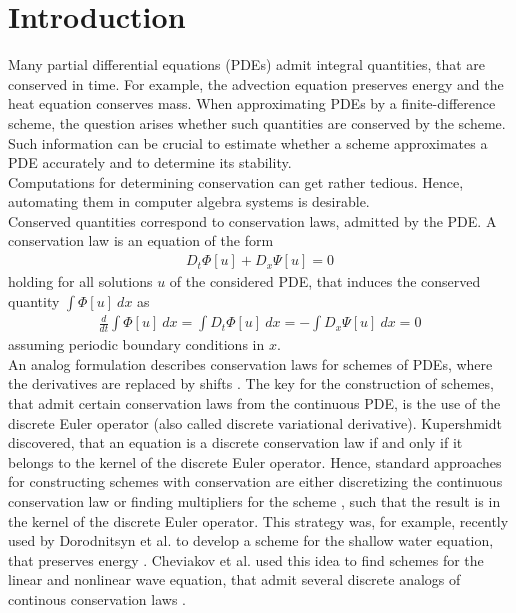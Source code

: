 \documentclass[manuscript]{acmart}
\newcommand{\1}{{\chi}}
\numberwithin{equation}{section}
\theoremstyle{thmlemcorr}
\numberwithin{theorem}{section}
\theoremstyle{thmlemcorr*}
\theoremstyle{defi}
\theoremstyle{remexample}
\theoremstyle{ass}
\begin{document}
\section{Introduction}
Many partial differential equations (PDEs) admit integral quantities, that are conserved in time. 
For example, the advection equation preserves energy and the heat equation conserves mass. 
When approximating PDEs by a finite-difference scheme, the question arises whether such quantities are conserved by the scheme. 
Such information can be crucial to estimate whether a scheme approximates a PDE accurately and to determine its stability.\\
Computations for determining conservation can get rather tedious.
Hence, automating them in computer algebra systems is desirable.\\
Conserved quantities correspond to conservation laws, admitted by the PDE. A conservation law \cite{cheviakov20} is an equation of the form
\begin{gather*}
	D_t\Phi[u]+D_x\Psi[u]=0
\end{gather*}
holding for all solutions $u$ of the considered PDE,
that induces the conserved quantity $\int \Phi[u]\ dx$ as
\begin{gather*}
	\frac{d}{dt}\int \Phi[u]\ dx=\int D_t\Phi[u]\ dx=-\int D_x\Psi[u]\ dx=0
\end{gather*}
assuming periodic boundary conditions in $x$.\\
An analog formulation describes conservation laws for schemes of PDEs, where the derivatives are replaced by shifts \cite{hydon01}.  The key for the construction of schemes, that admit certain conservation laws from the continuous PDE, is the use of the discrete Euler operator \cite{cheviakov20} (also called discrete variational derivative). Kupershmidt \cite[II. Theorem 31]{kupershmidt85} discovered, that an equation is a discrete conservation law if and only if it belongs to the kernel of the discrete Euler operator. Hence, standard approaches for constructing schemes with conservation are either discretizing the continuous conservation law or finding multipliers for the scheme \cite{dorodnitsyn21}, such that the result is in the kernel of the discrete Euler operator.
This strategy was, for example, recently used by Dorodnitsyn et al. to develop a scheme for the shallow water equation, that preserves energy \cite{dorodnitsyn21}. Cheviakov et al. used this idea to find schemes for the linear and nonlinear wave equation, that admit several discrete analogs of continous conservation laws \cite{cheviakov20}.
\end{document}
